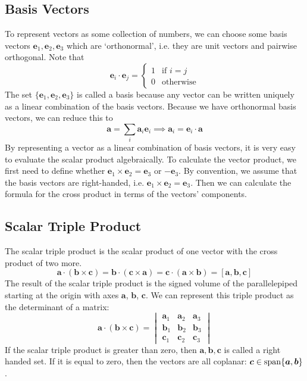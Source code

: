 \documentclass{article}
\begin{document}
	\subsection{Basis Vectors}
	To represent vectors as some collection of numbers, we can choose some basis vectors $\bm e_1, \bm e_2, \bm e_3$ which are `orthonormal', i.e. they are unit vectors and pairwise orthogonal. Note that
	\[ \bm e_i \cdot \bm e_j = \begin{cases}
		1 & \text{if } i = j \\
		0 & \text{otherwise}
	\end{cases} \]
	The set $\{ \bm e_1, \bm e_2, \bm e_3 \}$ is called a basis because any vector can be written uniquely as a linear combination of the basis vectors. Because we have orthonormal basis vectors, we can reduce this to
	\[ \bm a = \sum_i \bm a_i \bm e_i \implies \bm a_i = \bm e_i \cdot \bm a \]
	By representing a vector as a linear combination of basis vectors, it is very easy to evaluate the scalar product algebraically. To calculate the vector product, we first need to define whether $\bm e_1 \times \bm e_2 = \bm e_3$ or $-\bm e_3$. By convention, we assume that the basis vectors are right-handed, i.e. $\bm e_1 \times \bm e_2 = \bm e_3$. Then we can calculate the formula for the cross product in terms of the vectors' components.
	
	\subsection{Scalar Triple Product}
	The scalar triple product is the scalar product of one vector with the cross product of two more.
	\[ \bm a \cdot (\bm b \times \bm c) = \bm b \cdot (\bm c \times \bm a) = \bm c \cdot (\bm a \times \bm b) = [\bm a, \bm b, \bm c] \]
	The result of the scalar triple product is the signed volume of the parallelepiped starting at the origin with axes $\bm a$, $\bm b$, $\bm c$. We can represent this triple product as the determinant of a matrix:
	\[
	\bm a \cdot (\bm b \times \bm c) =
	\begin{vmatrix}
		\bm a_1 & \bm a_2 & \bm a_3 \\
		\bm b_1 & \bm b_2 & \bm b_3 \\
		\bm c_1 & \bm c_2 & \bm c_3
	\end{vmatrix}
	\]
	If the scalar triple product is greater than zero, then $\bm a, \bm b, \bm c$ is called a right handed set. If it is equal to zero, then the vectors are all coplanar: $\bm c \in \operatorname{span} \{ \bm a, \bm b \}$.
	
\end{document}
